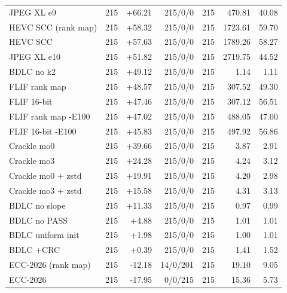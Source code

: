 \begin{table}[t]
\begin{tabular}{lrrrrrr}
JPEG XL e9 & 215 & +66.21 & 215/0/0 & 215 & 470.81 & 40.08 \\
HEVC SCC (rank map) & 215 & +58.32 & 215/0/0 & 215 & 1723.61 & 59.70 \\
HEVC SCC & 215 & +57.63 & 215/0/0 & 215 & 1789.26 & 58.27 \\
JPEG XL e10 & 215 & +51.82 & 215/0/0 & 215 & 2719.75 & 44.52 \\
BDLC no k2 & 215 & +49.12 & 215/0/0 & 215 & 1.14 & 1.11 \\
FLIF rank map & 215 & +48.57 & 215/0/0 & 215 & 307.52 & 49.30 \\
FLIF 16-bit & 215 & +47.46 & 215/0/0 & 215 & 307.12 & 56.51 \\
FLIF rank map -E100 & 215 & +47.02 & 215/0/0 & 215 & 488.05 & 47.00 \\
FLIF 16-bit -E100 & 215 & +45.83 & 215/0/0 & 215 & 497.92 & 56.86 \\
Crackle mo0 & 215 & +39.66 & 215/0/0 & 215 & 3.87 & 2.91 \\
Crackle mo3 & 215 & +24.28 & 215/0/0 & 215 & 4.24 & 3.12 \\
Crackle mo0 + zstd & 215 & +19.91 & 215/0/0 & 215 & 4.20 & 2.98 \\
Crackle mo3 + zstd & 215 & +15.58 & 215/0/0 & 215 & 4.31 & 3.13 \\
BDLC no slope & 215 & +11.33 & 215/0/0 & 215 & 0.97 & 0.99 \\
BDLC no PASS & 215 & +4.88 & 215/0/0 & 215 & 1.01 & 1.01 \\
BDLC uniform init & 215 & +1.98 & 215/0/0 & 215 & 1.00 & 1.01 \\
BDLC +CRC & 215 & +0.39 & 215/0/0 & 215 & 1.41 & 1.52 \\
ECC-2026 (rank map) & 215 & -12.18 & 14/0/201 & 215 & 19.10 & 9.05 \\
ECC-2026 & 215 & -17.95 & 0/0/215 & 215 & 15.36 & 5.73 \\
\hline
\end{tabular}
\end{table}
